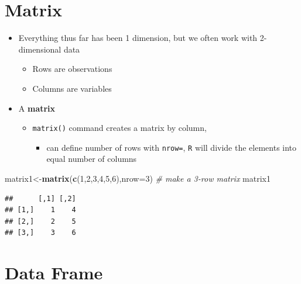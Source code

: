 \documentclass[]{book}
\newenvironment{Shaded}{\begin{snugshade}}{\end{snugshade}}
\newcommand{\KeywordTok}[1]{\textcolor[rgb]{0.13,0.29,0.53}{\textbf{#1}}}
\newcommand{\DataTypeTok}[1]{\textcolor[rgb]{0.13,0.29,0.53}{#1}}
\newcommand{\DecValTok}[1]{\textcolor[rgb]{0.00,0.00,0.81}{#1}}
\newcommand{\CommentTok}[1]{\textcolor[rgb]{0.56,0.35,0.01}{\textit{#1}}}
\newcommand{\NormalTok}[1]{#1}
\providecommand{\tightlist}{%
  \setlength{\itemsep}{0pt}\setlength{\parskip}{0pt}}
\theoremstyle{definition}
\theoremstyle{definition}
\theoremstyle{definition}
\theoremstyle{remark}
\begin{document}
\section{Matrix}\label{matrix}

\begin{itemize}
\tightlist
\item
  Everything thus far has been 1 dimension, but we often work with
  2-dimensional data

  \begin{itemize}
  \tightlist
  \item
    Rows are observations
  \item
    Columns are variables
  \end{itemize}
\item
  A \textbf{matrix}

  \begin{itemize}
  \tightlist
  \item
    \texttt{matrix()} command creates a matrix by column,

    \begin{itemize}
    \tightlist
    \item
      can define number of rows with \texttt{nrow=}, \texttt{R} will
      divide the elements into equal number of columns
    \end{itemize}
  \end{itemize}
\end{itemize}

\begin{Shaded}
\begin{Highlighting}[]
\NormalTok{matrix1<-}\KeywordTok{matrix}\NormalTok{(}\KeywordTok{c}\NormalTok{(}\DecValTok{1}\NormalTok{,}\DecValTok{2}\NormalTok{,}\DecValTok{3}\NormalTok{,}\DecValTok{4}\NormalTok{,}\DecValTok{5}\NormalTok{,}\DecValTok{6}\NormalTok{),}\DataTypeTok{nrow=}\DecValTok{3}\NormalTok{) }\CommentTok{# make a 3-row matrix}
\NormalTok{matrix1 }
\end{Highlighting}
\end{Shaded}

\begin{verbatim}
##      [,1] [,2]
## [1,]    1    4
## [2,]    2    5
## [3,]    3    6
\end{verbatim}

\section{Data Frame}\label{data-frame}
\end{document}
